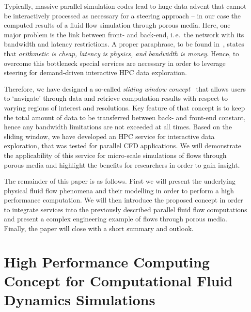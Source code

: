 \documentclass[10pt, conference]{IEEEtran}
\begin{document}
Typically, massive parallel simulation codes lead to huge data advent that cannot be interactively processed as necessary for a steering approach -- in our case the computed results of a fluid
flow simulation through porous media. Here, one major problem is the link between front- and back-end, i.\,e.\ the network with its bandwidth and latency restrictions. A proper paraphrase, to be
found in~\cite{Hoemmen2010}, states that \emph{arithmetic is cheap, latency is physics, and bandwidth is money}. Hence, to overcome this bottleneck special services are necessary in
order to leverage steering for demand-driven interactive HPC data exploration.

Therefore, we have designed a so-called \emph{sliding window concept}~\cite{Mundani2013} that allows users to `navigate' through data and retrieve computation results with respect to varying
regions of interest and resolutions. Key feature of that concept is to keep the total amount of data to be transferred between back- and front-end constant, hence any bandwidth limitations are
not exceeded at all times. Based on the sliding window, we have developed an HPC service for interactive data exploration, that was tested for parallel CFD applications. We will demonstrate
the applicability of this service for micro-scale simulations of flows through porous media and highlight the benefits for researchers in order to gain insight.

The remainder of this paper is as follows. First we will present the underlying physical fluid flow phenomena and their modelling in order to perform a high performance computation. We will then
introduce the proposed concept in order to integrate services into the previously described parallel fluid flow computations and present a complex engineering example of flows through porous
media. Finally, the paper will close with a short summary and outlook.


\section{High Performance Computing Concept for Computational Fluid Dynamics Simulations}
\label{sec:nse_and_hpc}

\end{document}

